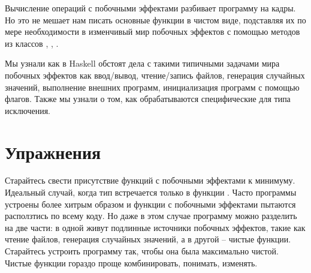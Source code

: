 Вычисление операций с побочными эффектами разбивает
программу на кадры. Но это не мешает нам писать основные
функции в чистом виде, подставляя их по мере необходимости
в изменчивый мир побочных эффектов 
с помощью методов из классов , ,
.

Мы узнали как в Haskell обстоят дела с такими типичными
задачами мира побочных эффектов как ввод/вывод, чтение/запись файлов,
генерация случайных значений, выполнение внешних программ,
инициализация программ с помощью флагов. Также мы узнали
о том, как обрабатываются специфические для типа  
исключения.


\section{Упражнения}

Старайтесь свести присутствие функций с побочными 
эффектами к минимуму. Идеальный случай, когда тип 
встречается только в функции . Часто программы
устроены более хитрым образом и функции с побочными 
эффектами пытаются расползтись по всему коду. Но даже
в этом случае программу можно разделить на две части:
в одной живут подлинные источники побочных эффектов, 
такие как чтение файлов, генерация случайных значений,
а в другой -- чистые функции. Старайтесь устроить программу
так, чтобы она была максимально чистой. Чистые функции
гораздо проще комбинировать, понимать, изменять.  

